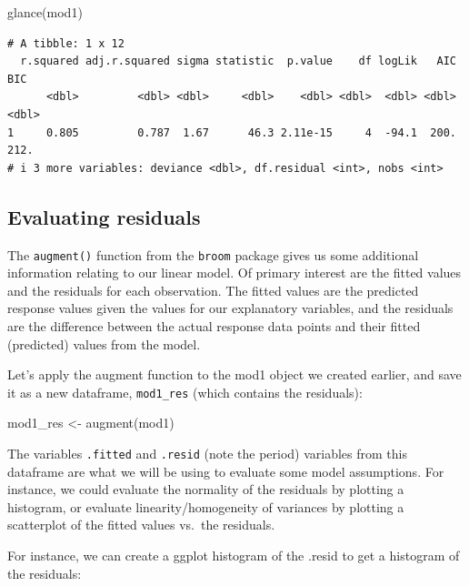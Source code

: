 \documentclass[
  letterpaper,
  DIV=11,
  numbers=noendperiod]{scrartcl}
\newenvironment{Shaded}{\begin{snugshade}}{\end{snugshade}}
\newcommand{\FunctionTok}[1]{\textcolor[rgb]{0.28,0.35,0.67}{#1}}
\newcommand{\NormalTok}[1]{\textcolor[rgb]{0.00,0.23,0.31}{#1}}
\newcommand{\OtherTok}[1]{\textcolor[rgb]{0.00,0.23,0.31}{#1}}
\begin{document}
\begin{Shaded}
\begin{Highlighting}[]
\FunctionTok{glance}\NormalTok{(mod1)}
\end{Highlighting}
\end{Shaded}

\begin{verbatim}
# A tibble: 1 x 12
  r.squared adj.r.squared sigma statistic  p.value    df logLik   AIC   BIC
      <dbl>         <dbl> <dbl>     <dbl>    <dbl> <dbl>  <dbl> <dbl> <dbl>
1     0.805         0.787  1.67      46.3 2.11e-15     4  -94.1  200.  212.
# i 3 more variables: deviance <dbl>, df.residual <int>, nobs <int>
\end{verbatim}

\subsection{Evaluating residuals}\label{evaluating-residuals}

The \texttt{augment()} function from the \texttt{broom} package gives us
some additional information relating to our linear model. Of primary
interest are the fitted values and the residuals for each observation.
The fitted values are the predicted response values given the values for
our explanatory variables, and the residuals are the difference between
the actual response data points and their fitted (predicted) values from
the model.

Let's apply the augment function to the mod1 object we created earlier,
and save it as a new dataframe, \texttt{mod1\_res} (which contains the
residuals):

\begin{Shaded}
\begin{Highlighting}[]
\NormalTok{mod1\_res }\OtherTok{\textless{}{-}} \FunctionTok{augment}\NormalTok{(mod1)}
\end{Highlighting}
\end{Shaded}

The variables \texttt{.fitted} and \texttt{.resid} (note the period)
variables from this dataframe are what we will be using to evaluate some
model assumptions. For instance, we could evaluate the normality of the
residuals by plotting a histogram, or evaluate linearity/homogeneity of
variances by plotting a scatterplot of the fitted values vs.~the
residuals.

For instance, we can create a ggplot histogram of the .resid to get a
histogram of the residuals:
\end{document}
